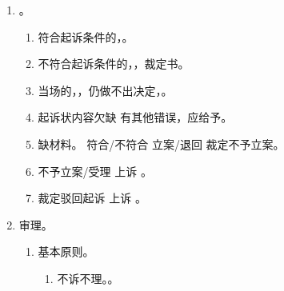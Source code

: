 \begin{enumerate}
\begin{enumerate}
\begin{enumerate}
\begin{kk}{收到}
\begin{enumerate}
                            \item {}。。
                            \item {}。最长保护 5、20。最长保护期。普通 5 年，不动产 20 年。。
                          \end{enumerate}
                          \tcblower
                          注意。得是当事人知。
                          。
                        \end{kk}
                  \item 过起诉期不予立案。
                \end{enumerate}
          \item 仅的可以口头起诉、委托诉讼代理人。
        \end{enumerate}
  \item {}。
        \begin{enumerate}
          \item 符合起诉条件的，。
          \item 不符合起诉条件的，，裁定书。
          \item 当场的，，仍做不出决定，。
          \item 起诉状内容欠缺 \hz 有其他错误，应给予。
          \item 缺材料。 \yjt 符合/不符合 \yjt 立案/退回 \dy 裁定不予立案。
          \item 不予立案/受理 \yjt 上诉 \yjt {}。
          \item 裁定驳回起诉 \yjt 上诉 \yjt {}。
        \end{enumerate}
  \item 审理。
        \begin{enumerate}
          \item 基本原则。
                \begin{enumerate}
                  \item 不诉不理。。
                        \begin{enumerate}

\end{enumerate}
\end{enumerate}
\end{enumerate}
\end{enumerate}
